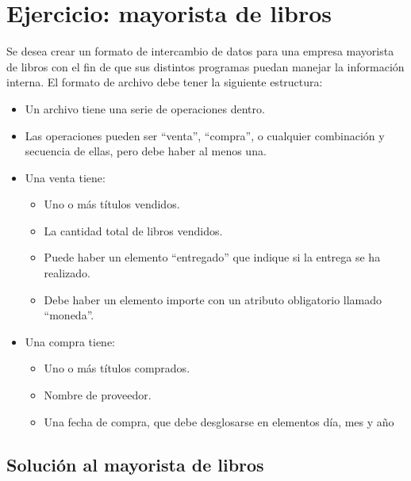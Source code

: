 \documentclass[letterpaper,10pt,spanish]{sphinxmanual}
\begin{document}
\section{Ejercicio: mayorista de libros}
\label{tema5:ejercicio-mayorista-de-libros}
Se desea crear un formato de intercambio de datos para una empresa mayorista de libros con el fin de que sus distintos programas puedan manejar la información interna. El formato de archivo debe tener la siguiente estructura:
\begin{itemize}
\item {} 
Un archivo tiene una serie de operaciones dentro.

\item {} 
Las operaciones pueden ser ``venta'', ``compra'', o cualquier combinación y secuencia de ellas, pero debe haber al menos una.

\item {} 
Una venta tiene:
\begin{itemize}
\item {} 
Uno o más títulos vendidos.

\item {} 
La cantidad total de libros vendidos.

\item {} 
Puede haber un elemento ``entregado'' que indique si la entrega se ha realizado.

\item {} 
Debe haber un elemento importe con un atributo obligatorio llamado ``moneda''.

\end{itemize}

\item {} 
Una compra tiene:
\begin{itemize}
\item {} 
Uno o más títulos comprados.

\item {} 
Nombre de proveedor.

\item {} 
Una fecha de compra, que debe desglosarse en elementos día, mes y año

\end{itemize}

\end{itemize}


\subsection{Solución al mayorista de libros}
\label{tema5:solucion-al-mayorista-de-libros}
\end{document}
